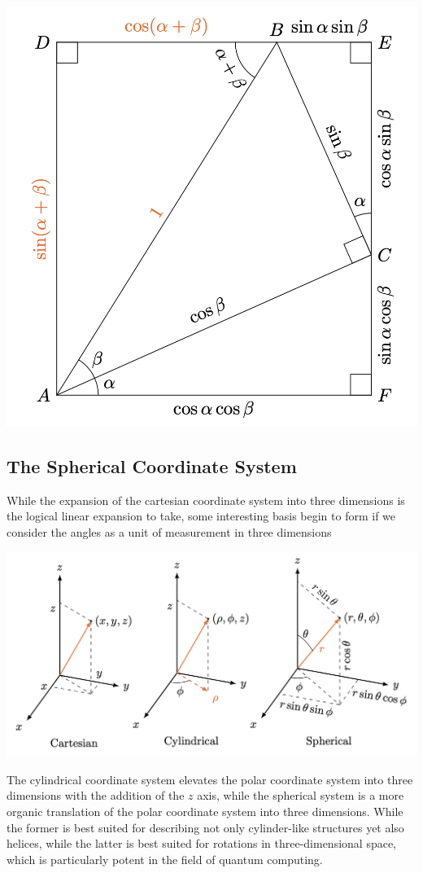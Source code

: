 \documentclass[12pt]{article}
\theoremstyle{plain}
\theoremstyle{definition}
\begin{document}
\includegraphics[width=\textwidth]{2_trig7.png}

\subsection{The Spherical Coordinate System}

While the expansion of the cartesian coordinate system into three dimensions is the logical linear expansion to take, some interesting basis begin to form if we consider the angles as a unit of measurement in three dimensions

\includegraphics[width=\textwidth]{2_trig8.png}

The cylindrical coordinate system elevates the polar coordinate system into three dimensions with the addition of the $z$ axis, while the spherical system is a more organic translation of the polar coordinate system into three dimensions. While the former is best suited for describing not only cylinder-like structures yet also helices, while the latter is best suited for rotations in three-dimensional space, which is particularly potent in the field of quantum computing. 
\end{document}
